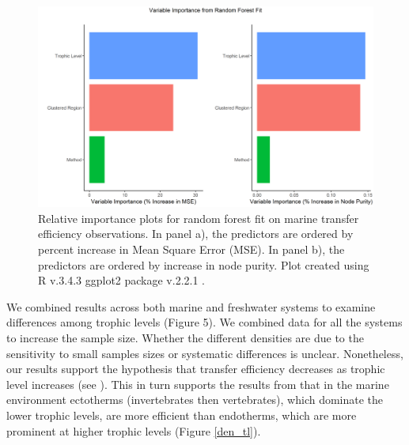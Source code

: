 \documentclass[oneside,12pt,final]{sty/ucthesis-CA2012}
\let\cite\citep                             %
\begin{document}
\begin{mainmatter}
\begin{figure}[H]
     \centering
       \includegraphics[width=\textwidth]{fig/var_imp_plot}
    \caption{Relative importance plots for random forest fit on marine transfer efficiency observations. In panel a), the predictors are ordered by percent increase in Mean Square Error (MSE). In panel b), the predictors are ordered by increase in node purity. Plot created using R v.3.4.3 \cite{Rcite} ggplot2 package v.2.2.1 \cite{ggplot}. }
    \label{varimp}
\end{figure}

We combined results across both marine and freshwater systems to examine differences among trophic levels (Figure 5). We combined data for all the systems to increase the sample size. Whether the different densities are due to the sensitivity to small samples sizes or systematic differences is unclear. Nonetheless, our results support the hypothesis that transfer efficiency decreases as trophic level increases (see \citealt{garcia2012reconsidering}). This in turn supports the results from  \citet{may1983ecology} that in the marine environment ectotherms (invertebrates then vertebrates), which dominate the lower trophic levels, are more efficient than endotherms, which are more prominent at higher trophic levels (Figure \ref{den_tl}). 


\end{mainmatter}
\end{document}
